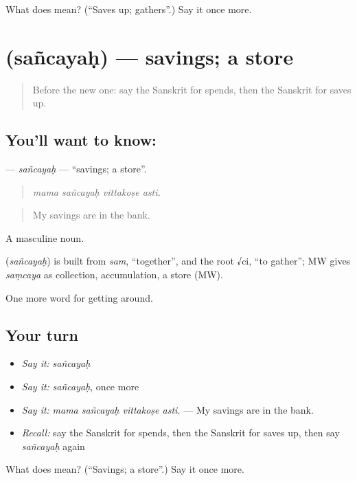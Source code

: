 \begin{tcolorbox}[breakable,colback=teal!4,colframe=teal!35!black,title={Before you move on}]
What does  mean? (\textquotedblleft{}Saves up; gathers\textquotedblright{}.) Say it once more.
\end{tcolorbox}
\section[\texorpdfstring{\sk{सञ्चयः} (sañcayaḥ)}{सञ्चयः (sañcayaḥ)}]{ (sañcayaḥ) — savings; a store}

\label{lesson:SA-C432-sancayah}



\begin{quote}
Before the new one: say the Sanskrit for spends, then the Sanskrit for saves up.
\end{quote}

\subsection*{You'll want to know: }
\textbf{} — \emph{sañcayaḥ} — \textquotedblleft{}savings; a store\textquotedblright{}.

\begin{quote}
   
\end{quote}

\begin{quote}
\emph{mama sañcayaḥ vittakoṣe asti.}
\end{quote}

\begin{quote}
My savings are in the bank.
\end{quote}

A masculine noun.

\begin{cousinweb}
\textbf{} (\emph{sañcayaḥ}) is built from \emph{sam}, \textquotedblleft{}together\textquotedblright{}, and the root √ci, \textquotedblleft{}to gather\textquotedblright{}; MW gives \emph{saṃcaya} as collection, accumulation, a store (MW).
\end{cousinweb}

\begin{grammarlens}[title={What you've built}]
One more word for getting around.
\end{grammarlens}

\subsection*{Your turn}
\begin{itemize}
\raggedright
  \item \emph{Say it:} \emph{sañcayaḥ}
  \item \emph{Say it:} \emph{sañcayaḥ}, once more
  \item \emph{Say it:} \emph{mama sañcayaḥ vittakoṣe asti.} — My savings are in the bank.
  \item \emph{Recall:} say the Sanskrit for spends, then the Sanskrit for saves up, then say \emph{sañcayaḥ} again
\end{itemize}

\begin{tcolorbox}[breakable,colback=teal!4,colframe=teal!35!black,title={Before you move on}]
What does  mean? (\textquotedblleft{}Savings; a store\textquotedblright{}.) Say it once more.
\end{tcolorbox}

